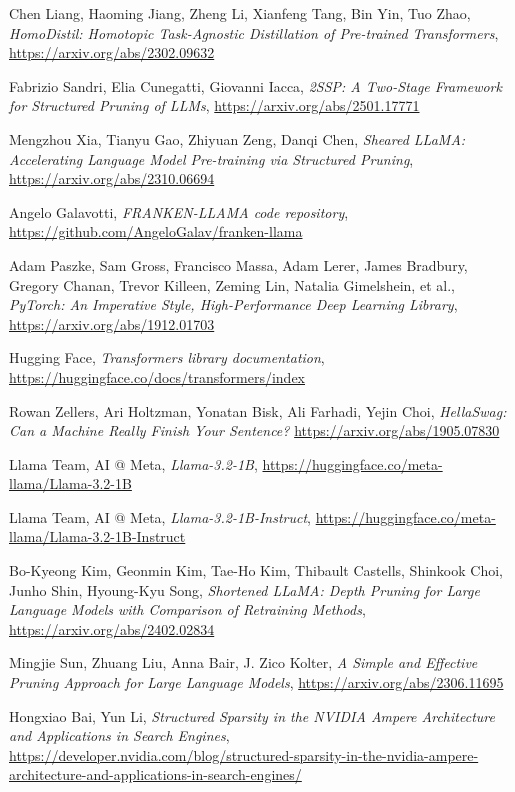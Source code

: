 \begin{thebibliography}{9}
	Chen Liang, Haoming Jiang, Zheng Li, Xianfeng Tang, Bin Yin, Tuo Zhao,
	\textit{HomoDistil: Homotopic Task-Agnostic Distillation of Pre-trained Transformers},
	\url{https://arxiv.org/abs/2302.09632}

	Fabrizio Sandri, Elia Cunegatti, Giovanni Iacca,
	\textit{2SSP: A Two-Stage Framework for Structured Pruning of LLMs},
	\url{https://arxiv.org/abs/2501.17771}

	Mengzhou Xia, Tianyu Gao, Zhiyuan Zeng, Danqi Chen,
	\textit{Sheared LLaMA: Accelerating Language Model Pre-training via Structured Pruning},
	\url{https://arxiv.org/abs/2310.06694}

	Angelo Galavotti,
	\textit{FRANKEN-LLAMA code repository},
	\url{https://github.com/AngeloGalav/franken-llama}

	Adam Paszke, Sam Gross, Francisco Massa, Adam Lerer, James Bradbury, Gregory Chanan, Trevor Killeen, Zeming Lin, Natalia Gimelshein, et al.,
	\textit{PyTorch: An Imperative Style, High-Performance Deep Learning Library},
	\url{https://arxiv.org/abs/1912.01703}

	Hugging Face,
	\textit{Transformers library documentation},
	\url{https://huggingface.co/docs/transformers/index}

	Rowan Zellers, Ari Holtzman, Yonatan Bisk, Ali Farhadi, Yejin Choi,
	\textit{HellaSwag: Can a Machine Really Finish Your Sentence?}
	\url{https://arxiv.org/abs/1905.07830}

	Llama Team, AI @ Meta,
	\textit{Llama-3.2-1B},
	\url{https://huggingface.co/meta-llama/Llama-3.2-1B}

	Llama Team, AI @ Meta,
	\textit{Llama-3.2-1B-Instruct},
	\url{https://huggingface.co/meta-llama/Llama-3.2-1B-Instruct}

	Bo-Kyeong Kim, Geonmin Kim, Tae-Ho Kim, Thibault Castells, Shinkook Choi, Junho Shin, Hyoung-Kyu Song,
	\textit{Shortened LLaMA: Depth Pruning for Large Language Models with Comparison of Retraining Methods},
	\url{https://arxiv.org/abs/2402.02834}

	Mingjie Sun, Zhuang Liu, Anna Bair, J. Zico Kolter,
	\textit{A Simple and Effective Pruning Approach for Large Language Models},
	\url{https://arxiv.org/abs/2306.11695}

	Hongxiao Bai, Yun Li,
	\textit{Structured Sparsity in the NVIDIA Ampere Architecture and Applications in Search Engines},
	\url{https://developer.nvidia.com/blog/structured-sparsity-in-the-nvidia-ampere-architecture-and-applications-in-search-engines/}


\end{thebibliography}
